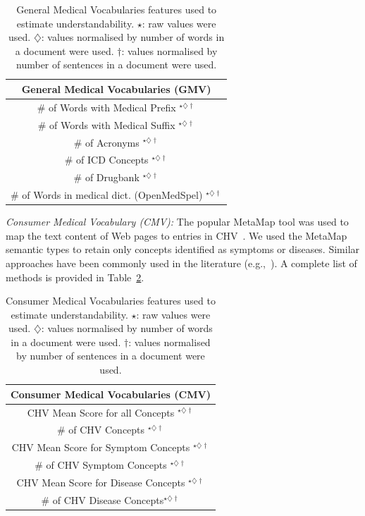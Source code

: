 \documentclass[10pt,a4paper]{article}
\begin{document}
\begin{table}
\caption{General Medical Vocabularies features used to estimate understandability.
$\star$: raw values were used. $\diamondsuit$: values normalised
by number of words in a document were used. $\dagger$: values normalised
by number of sentences in a document were used.}
\label{tab:doc_features_gmv} \vspace{-10pt}
\begin{tabular}{c}
\toprule 
\textbf{General Medical Vocabularies (GMV)}\tabularnewline
\midrule 
\# of Words with Medical Prefix  $^{\star\diamondsuit\dagger}$ \tabularnewline
\# of Words with Medical Suffix  $^{\star\diamondsuit\dagger}$ \tabularnewline
\# of Acronyms  $^{\star\diamondsuit\dagger}$                  \tabularnewline
\# of ICD Concepts $^{\star\diamondsuit\dagger}$               \tabularnewline
\# of Drugbank  $^{\star\diamondsuit\dagger}$                  \tabularnewline
\# of Words in medical dict. (OpenMedSpel)  $^{\star\diamondsuit\dagger}$ \tabularnewline
\bottomrule
\end{tabular}
\end{table}

\textit{Consumer Medical Vocabulary (CMV):}
The popular MetaMap \cite{aronson10} tool was used to map the text content of Web pages to entries in  CHV~\cite{zeng06}.
We used the MetaMap semantic types to retain only concepts identified as symptoms or diseases. Similar approaches have been commonly used in the literature (e.g.,~\cite{pang16,agrafiotesA16,palotti16,yates13}). A complete list of methods is provided in Table~\ref{tab:doc_features_cmv}.

\begin{table}
\caption{Consumer Medical Vocabularies features used to estimate understandability.
$\star$: raw values were used. $\diamondsuit$: values normalised
by number of words in a document were used. $\dagger$: values normalised
by number of sentences in a document were used.}
\label{tab:doc_features_cmv} \vspace{-10pt}
\begin{tabular}{c}
\toprule 
\textbf{Consumer Medical Vocabularies (CMV)}\tabularnewline
\midrule 
CHV Mean Score for all Concepts  $^{\star\diamondsuit\dagger}$ \tabularnewline
\# of CHV Concepts $^{\star\diamondsuit\dagger}$ \tabularnewline
CHV Mean Score for Symptom Concepts $^{\star\diamondsuit\dagger}$ \tabularnewline
\# of CHV Symptom Concepts $^{\star\diamondsuit\dagger}$ \tabularnewline
CHV Mean Score for Disease Concepts $^{\star\diamondsuit\dagger}$ \tabularnewline
\# of CHV Disease Concepts$^{\star\diamondsuit\dagger}$ \tabularnewline
\bottomrule
\end{tabular}
\end{table}
\end{document}
